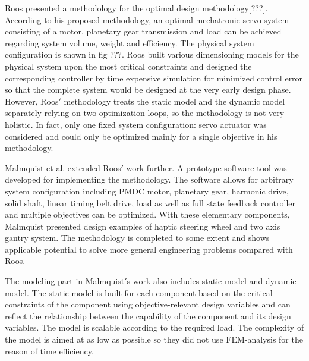 Roos presented a methodology for the optimal design methodology[???]. According to his proposed methodology, an optimal mechatronic servo system consisting of a motor, planetary gear transmission and load can be achieved regarding system volume, weight and efficiency. The physical system configuration is shown in fig ???. Roos built various dimensioning models for the physical system upon the most critical constraints and designed the corresponding controller by time expensive simulation for minimized control error so that the complete system would be designed at the very early design phase. However, Roos$'$ methodology treats the static model and the dynamic model separately relying on two optimization loops, so the methodology is not very holistic. In fact, only one fixed system configuration: servo actuator was considered and could only be optimized mainly for a single objective in his methodology.

Malmquist et al. extended Roos$'$ work further. A prototype software tool was developed for implementing the methodology. The software allows for arbitrary system configuration including PMDC motor, planetary gear, harmonic drive, solid shaft, linear timing belt drive, load as well as full state feedback controller and multiple objectives can be optimized. With these elementary components, Malmquist presented design examples of haptic steering wheel and two axis gantry system. The methodology is completed to some extent and shows applicable potential to solve more general engineering problems compared with Roos.

The modeling part in Malmquist$'$s work also includes static model and dynamic model. The static model is built for each component based on the critical constraints of the component using objective-relevant design variables and can reflect the relationship between the capability of the component and its design variables. The model is scalable according to the required load. The complexity of the model is aimed at as low as possible so they did not use FEM-analysis for the reason of time efficiency.

